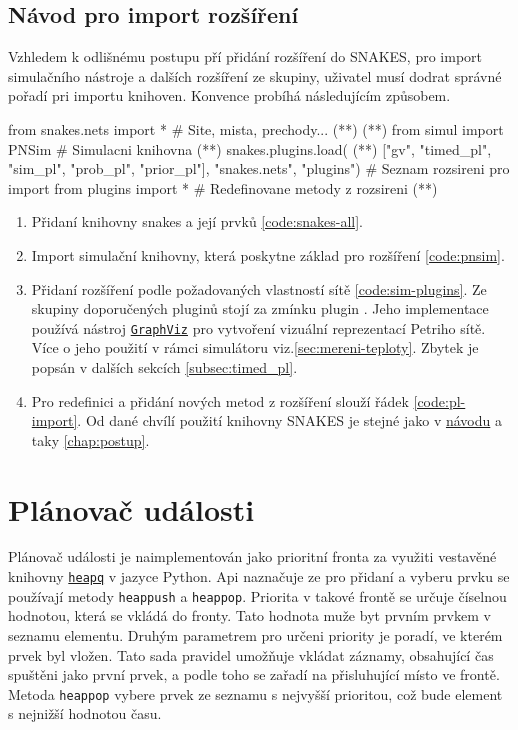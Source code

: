 \subsection{Návod pro import rozšíření}
Vzhledem k odlišnému postupu pří přidání rozšíření do SNAKES, pro import simulačního nástroje a dalších rozšíření ze skupiny, uživatel musí dodrat správné pořadí pri importu knihoven. Konvence probíhá následujícím způsobem.

\begin{python}
  from snakes.nets import *   # Site, mista, prechody... (*\label{code:snakes-all}*) (*\label{code:plugin-setup}*)
  from simul import PNSim     # Simulacni knihovna (*\label{code:pnsim}*)
  snakes.plugins.load( (*\label{code:sim-plugins}*)
    ["gv", "timed_pl", "sim_pl", "prob_pl", "prior_pl"],
    "snakes.nets",
    "plugins") # Seznam rozsireni pro import
  from plugins import * # Redefinovane metody z rozsireni (*\label{code:pl-import}*)
\end{python}

\begin{enumerate}
  \item Přidaní knihovny snakes a její prvků \ref{code:snakes-all}.
  \item Import simulační knihovny, která poskytne základ pro rozšíření \ref{code:pnsim}.
  \item Přidaní rozšíření podle požadovaných vlastností sítě \ref{code:sim-plugins}. Ze skupiny doporučených pluginů stojí za zmínku plugin \href{https://www.ibisc.univ-evry.fr/~fpommereau/SNAKES/API/plugins/gv.html}{}. Jeho implementace používá nástroj \href{https://www.graphviz.org/}{\texttt{GraphViz}} pro vytvoření vizuální reprezentací Petriho sítě. Více o jeho použití v rámci simulátoru viz.\ref{sec:mereni-teploty}. Zbytek je popsán v dalších sekcích \ref{subsec:timed_pl}.
  \item Pro redefinici a přidání nových metod z rozšíření slouží řádek \ref{code:pl-import}. Od dané chvílí použití knihovny SNAKES je stejné jako v \href{https://www.ibisc.univ-evry.fr/~fpommereau/SNAKES/first-steps-with-snakes.html}{návodu} a taky \ref{chap:postup}.
\end{enumerate}


\section{Plánovač události}
\label{sec:event-planner}
Plánovač události je naimplementován jako prioritní fronta za využiti vestavěné knihovny \href{https://docs.python.org/3/library/heapq.html}{\texttt{heapq}} v jazyce Python. Api naznačuje ze pro přidaní a vyberu prvku se používají metody \texttt{heappush} a \texttt{heappop}. Priorita v takové frontě se určuje číselnou hodnotou, která se vkládá do fronty. Tato hodnota muže byt prvním prvkem v seznamu elementu. Druhým parametrem pro určeni priority je poradí, ve kterém prvek byl vložen. Tato sada pravidel umožňuje vkládat záznamy, obsahující čas spuštěni jako první prvek, a podle toho se zařadí na přisluhující místo ve frontě. Metoda \texttt{heappop} vybere prvek ze seznamu s nejvyšší prioritou, což bude element s nejnižší hodnotou času.


